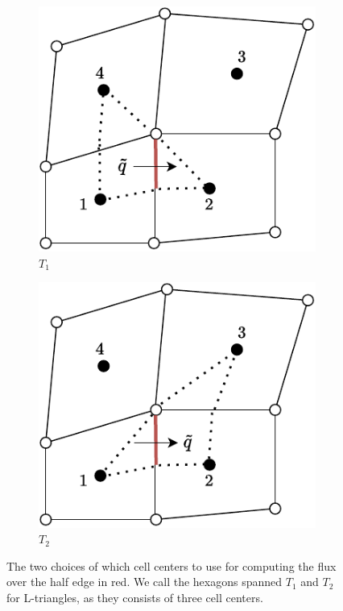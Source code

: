 \documentclass[../Main/main.tex]{subfiles}
\begin{document}
	\begin{figure}[H]
		\centering
		\begin{subfigure}[b]{0.4\textwidth}
			\centering
			\includegraphics[width=\textwidth]{left choice.pdf}
			\caption{$T_1$}
		\end{subfigure}
		\hfill
		\begin{subfigure}[b]{0.4\textwidth}
			\centering
			\includegraphics[width=\textwidth]{right choice.pdf}
			\caption{$T_2$}
			\label{fig:three sin x}
		\end{subfigure}
		\caption{The two choices of which cell centers to use for computing the flux over the half edge in red. We call the hexagons spanned $T_1$ and $T_2$ for L-triangles, as they consists of three cell centers.}
		\label{fig:two choices}
	\end{figure}
\end{document}
